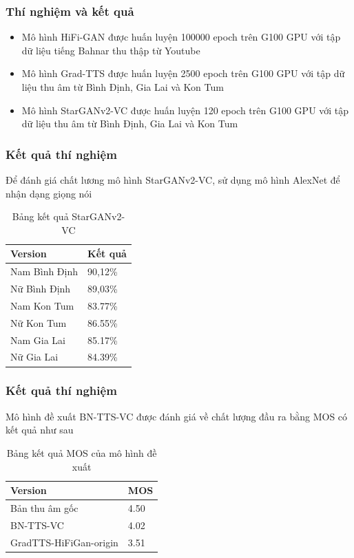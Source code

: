 \documentclass{beamer}
\numberwithin{figure}{section}
\numberwithin{table}{section}
\begin{document}
\begin{frame}
\frametitle{Thí nghiệm và kết quả}
\begin{itemize}
    \item Mô hình HiFi-GAN được huấn luyện 100000 epoch trên G100 GPU với tập dữ liệu tiếng Bahnar thu thập từ Youtube
    \pause
    \item Mô hình Grad-TTS được huấn luyện 2500 epoch trên G100 GPU với tập dữ liệu thu âm từ Bình Định, Gia Lai và Kon Tum
    \pause 
    \item Mô hình StarGANv2-VC được huấn luyện 120 epoch trên G100 GPU với tập dữ liệu thu âm từ Bình Định, Gia Lai và Kon Tum
\end{itemize}
\end{frame}
\begin{frame}
\frametitle{Kết quả thí nghiệm}
Để đánh giá chất lương mô hình StarGANv2-VC, sử dụng mô hình AlexNet \cite{alexnet} để nhận dạng giọng nói
\begin{table}
\begin{tabular}{l l}
\toprule
\textbf{Version} & \textbf{Kết quả} \\
\midrule
Nam Bình Định & 90,12\% \\
Nữ Bình Định & 89,03\% \\
Nam Kon Tum & 83.77\% \\
Nữ Kon Tum & 86.55\% \\
Nam Gia Lai & 85.17\% \\
Nữ Gia Lai & 84.39\% \\
\bottomrule
\end{tabular}
\caption{Bảng kết quả StarGANv2-VC}
\end{table}
\end{frame}
\begin{frame}
\frametitle{Kết quả thí nghiệm}
Mô hình đề xuất BN-TTS-VC được đánh giá về chất lượng đầu ra bằng MOS có kết quả như sau
\begin{table}
\begin{tabular}{l l}
\toprule
\textbf{Version} & \textbf{MOS} \\
\midrule
Bản thu âm gốc & 4.50 \\
BN-TTS-VC & 4.02 \\
GradTTS-HiFiGan-origin & 3.51 \\
\bottomrule
\end{tabular}
\caption{Bảng kết quả MOS của mô hình đề xuất}
\end{table}
\end{frame}
\end{document}

